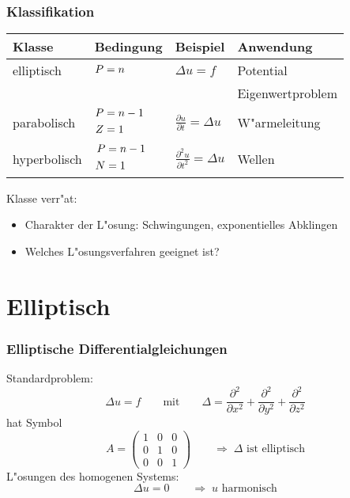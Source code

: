 \begin{frame}
\frametitle{Klassifikation}

\begin{center}
\begin{tabular}{llll}
Klasse&Bedingung&Beispiel&Anwendung\\
\hline
elliptisch &$\begin{aligned}P&=n\mathstrut\end{aligned}$
	&$\displaystyle \Delta u=f                                $
		&Potential\\
&	&	&Eigenwertproblem\\
\hline
parabolisch&%
$\begin{aligned}P&=n-1\mathstrut\\Z&=1\mathstrut\end{aligned}$
	&$\displaystyle \frac{\partial u}{\partial t}=\Delta u    $
		&W"armeleitung\\
\hline
hyperbolisch&%
$\begin{aligned}P&=n-1\mathstrut\\N&=1\mathstrut\end{aligned}$
	&$\displaystyle \frac{\partial^2 u}{\partial t^2}=\Delta u$
		&Wellen\\
\hline
\end{tabular}
\end{center}

Klasse verr"at:
\begin{itemize}
\item Charakter der L"osung: Schwingungen, exponentielles Abklingen
\item Welches L"osungsverfahren geeignet ist?
\end{itemize}

\end{frame}

\section{Elliptisch}

\begin{frame}
\frametitle{Elliptische Differentialgleichungen}
Standardproblem:
\[
\Delta u = f
\qquad\text{mit}\qquad
\Delta 
=
\frac{\partial^2}{\partial x^2}
+
\frac{\partial^2}{\partial y^2}
+
\frac{\partial^2}{\partial z^2}
\]
hat Symbol
\[
A=\begin{pmatrix}1&0&0\\0&1&0\\0&0&1\end{pmatrix}
\qquad
\Rightarrow
\;
\text{$\Delta$ ist elliptisch}
\]
L"osungen des homogenen Systems:
\[
\Delta u=0
\qquad\Rightarrow\;
\text{$u$ harmonisch}
\]
\end{frame}

